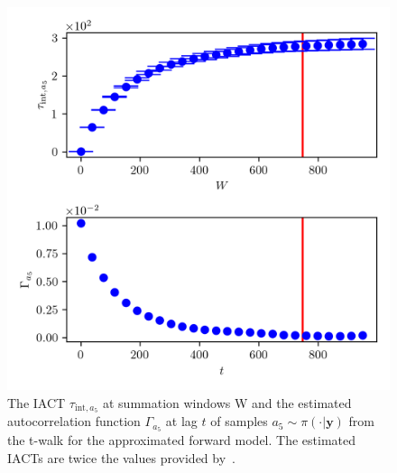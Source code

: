 \begin{figure}[ht!]
	\centering
	\includegraphics{UwerrTauIntTWalk15.png}
	\caption[IACT and autocorrelation function of samples $a_5 \sim \pi(\cdot|\bm{y})$, for approximated model.]{The IACT $\tau_{\text{int},a_5}$ at summation windows W and the estimated autocorrelation function $\Gamma_{a_5}$ at lag $t$ of samples $a_5 \sim \pi(\cdot| \bm{y})$ from the t-walk for the approximated forward model.
	The estimated IACTs are twice the values provided by~\cite{drikHesse, UwerrM}.}
	\label{fig:TWalkIATC16}
\end{figure}
